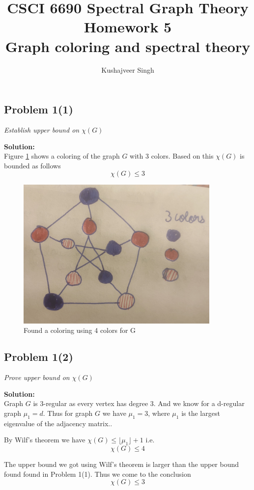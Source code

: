 \documentclass[12pt,a4paper]{article}
\title{CSCI 6690 Spectral Graph Theory Homework 5\\Graph coloring and spectral theory}
\author{Kushajveer Singh}
\date{}
\newcommand{\solution}{\noindent\textbf{Solution:}\\}
\begin{document}
\maketitle

\subsection*{Problem 1(1)}
\textit{
    Establish upper bound on $\chi(G)$
}

\solution
Figure \ref{fig:q_1} shows a coloring of the graph $G$ with 3 colors. Based on this $\chi(G)$ is bounded as follows
\begin{equation}
    \chi(G) \leq 3
\end{equation}
\begin{figure}[H]
    \centering
    \includegraphics[width=10cm]{q_1.jpg}
    \caption{Found a coloring using 4 colors for G}
    \label{fig:q_1}
\end{figure}

\newpage
\subsection*{Problem 1(2)}
\textit{
    Prove upper bound on $\chi(G)$
}

\solution
Graph $G$ is 3-regular as every vertex has degree 3. And we know for a d-regular graph $\mu_1 = d$. Thus for graph $G$ we have $\mu_1 = 3$, where $\mu_1$ is the largest eigenvalue of the adjacency matrix..

By Wilf's theorem we have $\chi(G) \leq \lfloor \mu_1 \rfloor + 1$ i.e.
\begin{equation}
    \chi(G) \leq 4
\end{equation}

The upper bound we got using Wilf's theorem is larger than the upper bound found found in Problem 1(1). Thus we come to the conclusion
\begin{equation}
    \chi(G) \leq 3
\end{equation}
\end{document}
